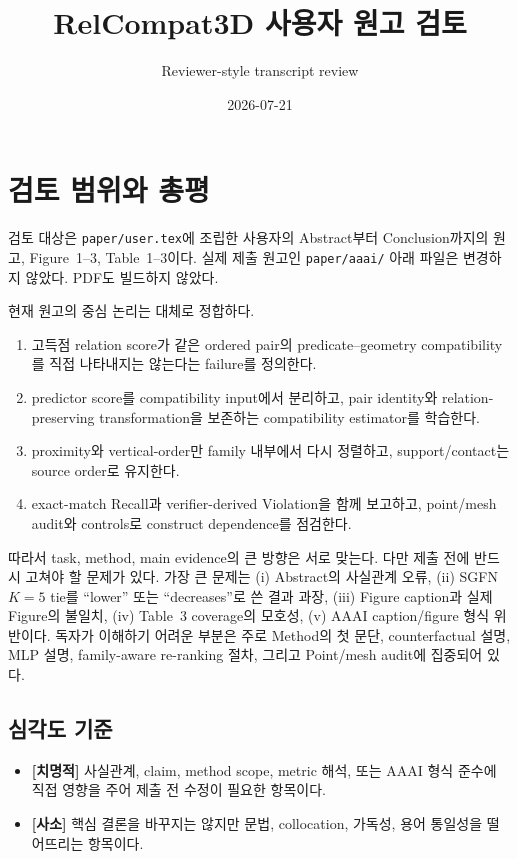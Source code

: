 \documentclass[11pt]{article}
\title{RelCompat3D 사용자 원고 검토}
\author{Reviewer-style transcript review}
\date{2026-07-21}
\newcommand{\fatal}{\textbf{\textcolor{fatalred}{[치명적]}}}
\newcommand{\minor}{\textbf{\textcolor{minorblue}{[사소]}}}
\newcommand{\fileline}[1]{\texttt{#1}}
\begin{document}
\maketitle

\section{검토 범위와 총평}

검토 대상은 \fileline{paper/user.tex}에 조립한 사용자의 Abstract부터
Conclusion까지의 원고, Figure~1--3, Table~1--3이다. 실제 제출 원고인
\fileline{paper/aaai/} 아래 파일은 변경하지 않았다. PDF도 빌드하지 않았다.

현재 원고의 중심 논리는 대체로 정합하다.

\begin{enumerate}[leftmargin=2em]
    \item 고득점 relation score가 같은 ordered pair의 predicate--geometry
    compatibility를 직접 나타내지는 않는다는 failure를 정의한다.
    \item predictor score를 compatibility input에서 분리하고, pair identity와
    relation-preserving transformation을 보존하는 compatibility estimator를
    학습한다.
    \item proximity와 vertical-order만 family 내부에서 다시 정렬하고,
    support/contact는 source order로 유지한다.
    \item exact-match Recall과 verifier-derived Violation을 함께 보고하고,
    point/mesh audit와 controls로 construct dependence를 점검한다.
\end{enumerate}

따라서 task, method, main evidence의 큰 방향은 서로 맞는다. 다만 제출 전에 반드시
고쳐야 할 문제가 있다. 가장 큰 문제는 (i) Abstract의 사실관계 오류, (ii) SGFN
$K=5$ tie를 ``lower'' 또는 ``decreases''로 쓴 결과 과장, (iii) Figure caption과
실제 Figure의 불일치, (iv) Table~3 coverage의 모호성, (v) AAAI caption/figure
형식 위반이다. 독자가 이해하기 어려운 부분은 주로 Method의 첫 문단, counterfactual
설명, MLP 설명, family-aware re-ranking 절차, 그리고 Point/mesh audit에 집중되어
있다.

\subsection{심각도 기준}

\begin{itemize}[leftmargin=2em]
    \item \fatal{} 사실관계, claim, method scope, metric 해석, 또는 AAAI 형식 준수에
    직접 영향을 주어 제출 전 수정이 필요한 항목이다.
    \item \minor{} 핵심 결론을 바꾸지는 않지만 문법, collocation, 가독성, 용어
    통일성을 떨어뜨리는 항목이다.
\end{itemize}
\end{document}
